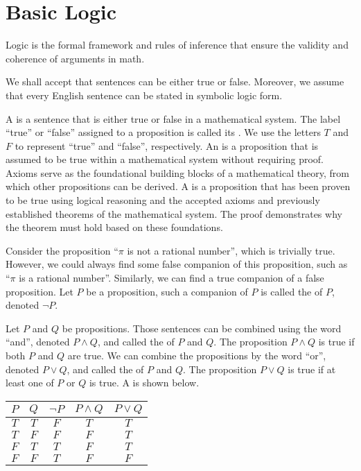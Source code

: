 \documentclass[10pt]{article}
\begin{document}
\section{Basic Logic}
Logic is the formal framework and rules of inference that ensure the validity and coherence of arguments in math. 
\begin{remark}
    We shall accept that sentences can be either true or false. Moreover, we assume that every English sentence can be stated in symbolic logic form.
\end{remark} 
\par
A  is a sentence that is either true or false in a mathematical system. The label ``true'' or ``false'' assigned to a proposition is called its . We use the letters $T$ and $F$ to represent ``true'' and ``false'', respectively. An  is a proposition that is assumed to be true within a mathematical system without requiring proof. Axioms serve as the foundational building blocks of a mathematical theory, from which other propositions can be derived. A  is a proposition that has been proven to be true using logical reasoning and the accepted axioms and previously established theorems of the mathematical system. The proof demonstrates why the theorem must hold based on these foundations.
\par
Consider the proposition ``$\pi$ is not a rational number'', which is trivially true. However, we could always find some false companion of this proposition, such as ``$\pi$ is a rational number''. Similarly, we can find a true companion of a false proposition. Let $P$ be a proposition, such a companion of $P$ is called the  of $P$, denoted $\neg P$.
\par
Let $P$ and $Q$ be propositions. Those sentences can be combined using the word ``and'', denoted $P\wedge Q$, and called the  of $P$ and $Q$. The proposition $P\wedge Q$ is true if both $P$ and $Q$ are true. We can combine the propositions by the word ``or'', denoted $P\vee Q$, and called the  of $P$ and $Q$. The proposition $P\vee Q$ is true if at least one of $P$ or $Q$ is true. A  is shown below.
\begin{center}
    \begin{tabular}{cc|ccc}
        $P$ & $Q$ & $\neg P$ & $P\wedge Q$ & $P\vee Q$ \\
        \hline
        $T$ & $T$ & $F$ & $T$ & $T$ \\
        $T$ & $F$ & $F$ & $F$ & $T$ \\
        $F$ & $T$ & $T$ & $F$ & $T$ \\
        $F$ & $F$ & $T$ & $F$ & $F$ \\
    \end{tabular}
\end{center}
\end{document}
